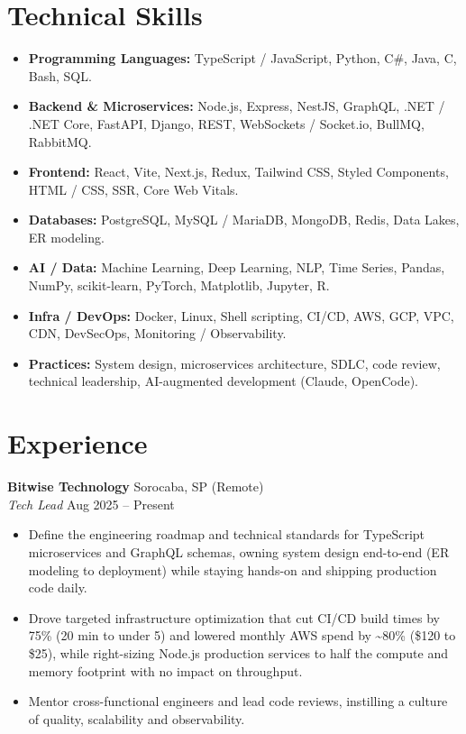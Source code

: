 \documentclass[11pt,a4paper]{article}
\newcommand{\company}[2]{%
  \needspace{5\baselineskip}%
  \textbf{#1} \hfill \textcolor{muted}{#2}\\[3pt]
}
\newcommand{\subrole}[2]{%
  \needspace{4\baselineskip}%
  \textit{#1} \hfill \textcolor{muted}{#2}\\[3pt]
}
\begin{document}
\section{Technical Skills}
\begin{itemize}[leftmargin=14pt, itemsep=2pt, topsep=0pt]
    \item \textbf{Programming Languages:} TypeScript / JavaScript, Python, C\#, Java, C, Bash, SQL.
    \item \textbf{Backend \& Microservices:} Node.js, Express, NestJS, GraphQL, .NET / .NET Core, FastAPI, Django, REST, WebSockets / Socket.io, BullMQ, RabbitMQ.
    \item \textbf{Frontend:} React, Vite, Next.js, Redux, Tailwind CSS, Styled Components, HTML / CSS, SSR, Core Web Vitals.
    \item \textbf{Databases:} PostgreSQL, MySQL / MariaDB, MongoDB, Redis, Data Lakes, ER modeling.
    \item \textbf{AI / Data:} Machine Learning, Deep Learning, NLP, Time Series, Pandas, NumPy, scikit-learn, PyTorch, Matplotlib, Jupyter, R.
    \item \textbf{Infra / DevOps:} Docker, Linux, Shell scripting, CI/CD, AWS, GCP, VPC, CDN, DevSecOps, Monitoring / Observability.
    \item \textbf{Practices:} System design, microservices architecture, SDLC, code review, technical leadership, AI-augmented development (Claude, OpenCode).
\end{itemize}

\section{Experience}

\company{Bitwise Technology}{Sorocaba, SP (Remote)}
\subrole{Tech Lead}{Aug 2025 -- Present}
\begin{itemize}[leftmargin=14pt, itemsep=2pt, topsep=0pt]
    \item Define the engineering roadmap and technical standards for TypeScript microservices and GraphQL schemas, owning system design end-to-end (ER modeling to deployment) while staying hands-on and shipping production code daily.
    \item Drove targeted infrastructure optimization that cut CI/CD build times by 75\% (20 min to under 5) and lowered monthly AWS spend by \textasciitilde80\% (\$120 to \$25), while right-sizing Node.js production services to half the compute and memory footprint with no impact on throughput.
    \item Mentor cross-functional engineers and lead code reviews, instilling a culture of quality, scalability and observability.
\end{itemize}
\vspace{3pt}
\end{document}
